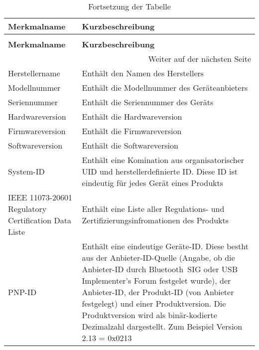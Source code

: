 \begin{longtable}[c]{|p{4cm}|p{11cm}|}
    \caption{Liste der verfügbaren Geräteinformationsmerkmale}
    \label{table:deviceinformationlist}\\
    \hline
    \textbf{Merkmalname} & \textbf{Kurzbeschreibung}\\
    \hline
    \endfirsthead

    \caption{Fortsetzung der Tabelle}\\
    \hline
    \textbf{Merkmalname} & \textbf{Kurzbeschreibung}\\
    \hline
    \endhead

    \hline
    \multicolumn{2}{|r|}{Weiter auf der nächsten Seite}\\
    \hline
    \endfoot

    \hline
    \endlastfoot
    
    Herstellername & Enthält den Namen des Herstellers \cite[S.~8]{bluetoothDeviceI}\\
    \hline
    Modellnummer & Enthält die Modellnummer des Geräteanbieters \cite[S.~8]{bluetoothDeviceI}\\
    \hline
    Seriennummer & Enthält die Seriennummer des Geräts \cite[S.~8]{bluetoothDeviceI}\\
    \hline
    Hardwareversion & Enthält die Hardwareversion \cite[S.~9]{bluetoothDeviceI}\\
    \hline
    Firmwareversion & Enthält die Firmwareversion \cite[S.~9]{bluetoothDeviceI}\\
    \hline
    Softwareversion & Enthält die Softwareversion \cite[S.~9]{bluetoothDeviceI}\\
    \hline
    System-ID & Enthält eine Komination aus organisatorischer UID und herstellerdefinierte ID. Diese ID ist eindeutig für jedes Gerät eines Produkts \cite[S.~9]{bluetoothDeviceI}\\
    \hline
    IEEE 11073-20601 Regulatory Certification Data Liste & Enthält eine Liste aller Regulations- und Zertifizierungsinfromationen des Produkts \cite[S.~9]{bluetoothDeviceI}\\
    \hline
    PNP-ID & Enthält eine eindeutige Geräte-ID. Diese bestht aus der Anbieter-ID-Quelle (Angabe, ob die Anbieter-ID durch Bluetooth~SIG oder USB Implementer's Forum festgelet wurde), der Anbieter-ID, der Produkt-ID (von Anbieter festgelegt) und einer Produktversion. Die Produktversion wird als binär-kodierte Dezimalzahl dargestellt. Zum Beispiel Version 2.13 = 0x0213 \cite[S.~10f.]{bluetoothDeviceI}\\
\end{longtable}

